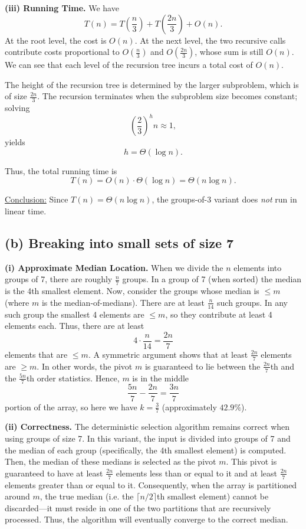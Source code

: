 \documentclass[11pt]{article}
\begin{document}
    \textbf{(iii) Running Time.}  
    We have
    \[
    T(n)= T\left(\frac{n}{3}\right) + T\left(\frac{2n}{3}\right) + O(n).
    \]
    At the root level, the cost is \(O(n)\). At the next level, the two recursive calls contribute costs proportional to \(O\left(\frac{n}{3}\right)\) and \(O\left(\frac{2n}{3}\right)\), whose sum is still \(O(n)\). We can see that each level of the recursion tree incurs a total cost of \(O(n)\).  
    
    The height of the recursion tree is determined by the larger subproblem, which is of size \(\frac{2n}{3}\). The recursion terminates when the subproblem size becomes constant; solving
    \[
    \left(\frac{2}{3}\right)^h n \approx 1,
    \]
    yields
    \[
    h = \Theta(\log n).
    \]
    
    Thus, the total running time is
    \[
    T(n)=O(n) \cdot \Theta(\log n)=\Theta(n\log n).
    \]
    
    \medskip
    
    \underline{Conclusion:}  
    Since \(T(n)=\Theta(n\log n)\), the groups-of-3 variant does \emph{not} run in linear time.
    
    \bigskip
    
    \subsection*{(b) Breaking into small sets of size 7}
    
    \textbf{(i) Approximate Median Location.}  
    When we divide the \(n\) elements into groups of 7, there are roughly \(\frac{n}{7}\) groups. In a group of 7 (when sorted) the median is the 4th smallest element. Now, consider the groups whose median is \(\le m\) (where \(m\) is the median-of-medians). There are at least \(\frac{n}{14}\) such groups. In any such group the smallest 4 elements are \(\le m\), so they contribute at least 4 elements each. Thus, there are at least
    \[
    4\cdot\frac{n}{14} = \frac{2n}{7}
    \]
    elements that are \(\le m\). A symmetric argument shows that at least \(\frac{2n}{7}\) elements are \(\ge m\). In other words, the pivot \(m\) is guaranteed to lie between the \(\frac{2n}{7}\)th and the \(\frac{5n}{7}\)th order statistics. Hence, \(m\) is in the middle
    \[
    \frac{5n}{7} - \frac{2n}{7} = \frac{3n}{7}
    \]
    portion of the array, so here we have \(k = \frac{3}{7}\) (approximately \(42.9\%\)).
    
    \medskip

    \textbf{(ii) Correctness.}  
    The deterministic selection algorithm remains correct when using groups of size 7. In this variant, the input is divided into groups of 7 and the median of each group (specifically, the 4th smallest element) is computed. Then, the median of these medians is selected as the pivot \(m\). This pivot is guaranteed to have at least \(\frac{2n}{7}\) elements less than or equal to it and at least \(\frac{2n}{7}\) elements greater than or equal to it. Consequently, when the array is partitioned around \(m\), the true median (i.e. the \(\lceil n/2 \rceil\)th smallest element) cannot be discarded—it must reside in one of the two partitions that are recursively processed. Thus, the algorithm will eventually converge to the correct median.
    
\end{document}
